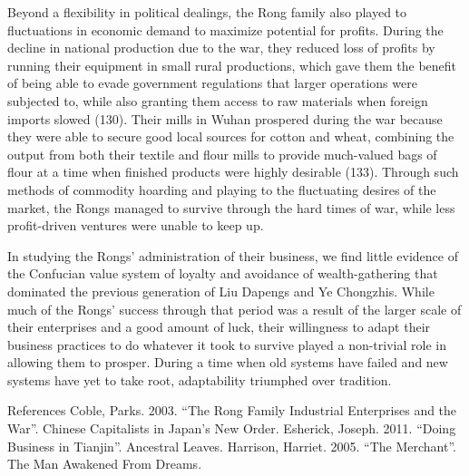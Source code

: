 Beyond a flexibility in political dealings, the Rong
family also played to fluctuations in economic
demand to maximize potential for profits. During the
decline in national production due to the war, they
reduced  loss of profits by running their equipment
in small rural productions, which gave them the
benefit of being able to evade government
regulations that larger operations were subjected
to, while also granting them access to raw materials
when foreign imports slowed (130). Their mills in
Wuhan prospered during the war because they were
able to secure good local sources for cotton and
wheat, combining the output from both their textile
and flour mills to provide much-valued bags of flour
at a time when finished products were highly
desirable (133). Through such methods of commodity
hoarding and playing to the fluctuating desires of
the market, the Rongs managed to survive through the
hard times of war, while less profit-driven ventures
were unable to keep up.

In studying the Rongs' administration of their
business, we find little evidence of the
Confucian value system of loyalty and avoidance
of wealth-gathering that dominated the previous
generation of Liu Dapengs and Ye Chongzhis.
While much of the Rongs' success through that
period was a result of the larger scale of their
enterprises and a good amount of luck, their
willingness to adapt their business practices to
do whatever it took to survive played a
non-trivial role in allowing them to prosper.
During a time when old systems have failed and
new systems have yet to take root, adaptability
triumphed over tradition.

References
Coble, Parks. 2003. “The Rong Family Industrial
Enterprises and the War”. Chinese Capitalists in 
Japan's New Order.
Esherick, Joseph. 2011. “Doing Business in
Tianjin”. Ancestral Leaves.
Harrison, Harriet. 2005. “The Merchant”. The
Man Awakened From Dreams.

